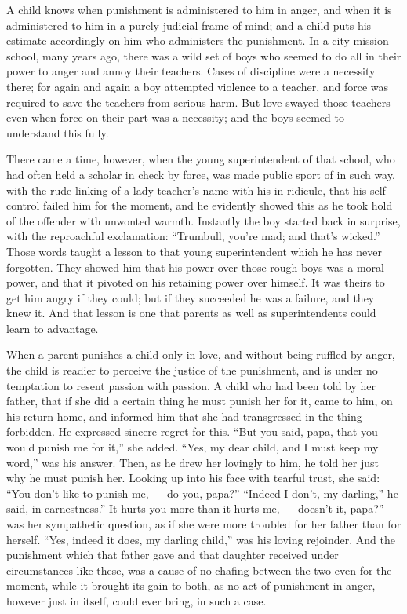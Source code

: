 \documentclass[
]{book}
\begin{document}
A child knows when punishment is administered to him in anger, and when it is administered to him in a purely judicial frame of mind; and a child puts his estimate accordingly on him who administers the punishment. In a city mission-school, many years ago, there was a wild set of boys who seemed to do all in their power to anger and annoy their teachers. Cases of discipline were a necessity there; for again and again a boy attempted violence to a teacher, and force was required to save the teachers from serious harm. But love swayed those teachers even when force on their part was a necessity; and the boys seemed to understand this fully.

There came a time, however, when the young superintendent of that school, who had often held a scholar in check by force, was made public sport of in such way, with the rude linking of a lady teacher's name with his in ridicule, that his self-control failed him for the moment, and he evidently showed this as he took hold of the offender with unwonted warmth. Instantly the boy started back in surprise, with the reproachful exclamation: ``Trumbull, you're mad; and that's wicked.'' Those words taught a lesson to that young superintendent which he has never forgotten. They showed him that his power over those rough boys was a moral power, and that it pivoted on his retaining power over himself. It was theirs to get him angry if they could; but if they succeeded he was a failure, and they knew it. And that lesson is one that parents as well as superintendents could learn to advantage.

When a parent punishes a child only in love, and without being ruffled by anger, the child is readier to perceive the justice of the punishment, and is under no temptation to resent passion with passion. A child who had been told by her father, that if she did a certain thing he must punish her for it, came to him, on his return home, and informed him that she had transgressed in the thing forbidden. He expressed sincere regret for this. ``But you said, papa, that you would punish me for it,'' she added. ``Yes, my dear child, and I must keep my word,'' was his answer. Then, as he drew her lovingly to him, he told her just why he must punish her. Looking up into his face with tearful trust, she said: ``You don't like to punish me, --- do you, papa?'' ``Indeed I don't, my darling,'' he said, in earnestness.'' It hurts you more than it hurts me, --- doesn't it, papa?'' was her sympathetic question, as if she were more troubled for her father than for herself. ``Yes, indeed it does, my darling child,'' was his loving rejoinder. And the punishment which that father gave and that daughter received under circumstances like these, was a cause of no chafing between the two even for the moment, while it brought its gain to both, as no act of punishment in anger, however just in itself, could ever bring, in such a case.
\end{document}
